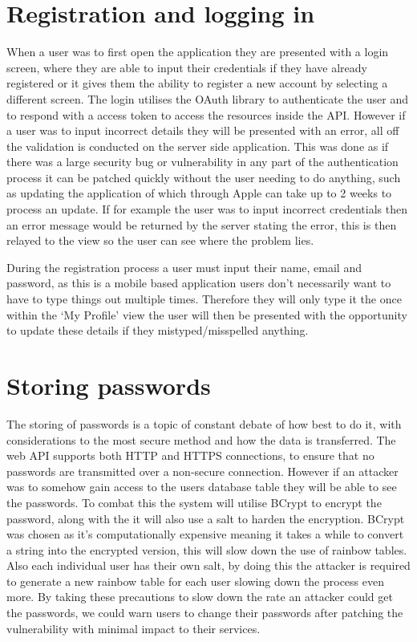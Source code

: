 	\section{Registration and logging in}
		When a user was to first open the application they are presented with a login screen, where they are able to input their credentials if they have already registered or it gives them the ability to register a new account by selecting a different screen. The login utilises the OAuth library to authenticate the user and to respond with a access token to access the resources inside the API. However if a user was to input incorrect details they will be presented with an error, all off the validation is conducted on the server side application. This was done as if there was a large security bug or vulnerability in any part of the authentication process it can be patched quickly without the user needing to do anything, such as updating the application of which through Apple can take up to 2 weeks to process an update. If for example the user was to input incorrect credentials then an error message would be returned by the server stating the error, this is then relayed to the view so the user can see where the problem lies. 

		During the registration process a user must input their name, email and password, as this is a mobile based application users don't necessarily want to have to type things out multiple times. Therefore they will only type it the once within the `My Profile' view the user will then be presented with the opportunity to update these details if they mistyped/misspelled anything. 

	\section{Storing passwords}
		The storing of passwords is a topic of constant debate of how best to do it, with considerations to the most secure method and how the data is transferred. The web API supports both HTTP and HTTPS connections, to ensure that no passwords are transmitted over a non-secure connection. However if an attacker was to somehow gain access to the users database table they will be able to see the passwords. To combat this the system will utilise BCrypt to encrypt the password, along with the it will also use a salt to harden the encryption. BCrypt was chosen as it's computationally expensive meaning it takes a while to convert a string into the encrypted version, this will slow down the use of rainbow tables. Also each individual user has their own salt, by doing this the attacker is required to generate a new rainbow table for each user slowing down the process even more. By taking these precautions to slow down the rate an attacker could get the passwords, we could warn users to change their passwords after patching the vulnerability with minimal impact to their services. 

